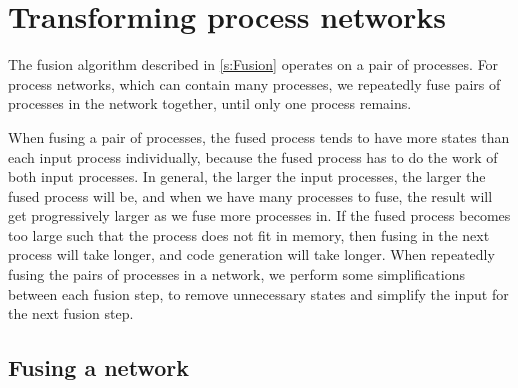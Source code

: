\section{Transforming process networks}
\label{s:Optimisation}

The fusion algorithm described in \autoref{s:Fusion} operates on a pair of processes.
For process networks, which can contain many processes, we repeatedly fuse pairs of processes in the network together, until only one process remains.

When fusing a pair of processes, the fused process tends to have more states than each input process individually, because the fused process has to do the work of both input processes.
In general, the larger the input processes, the larger the fused process will be, and when we have many processes to fuse, the result will get progressively larger as we fuse more processes in.
If the fused process becomes too large such that the process does not fit in memory, then fusing in the next process will take longer, and code generation will take longer.
When repeatedly fusing the pairs of processes in a network, we perform some simplifications between each fusion step, to remove unnecessary states and simplify the input for the next fusion step.



\subsection{Fusing a network}
\label{ss:Fusing:a:network}


